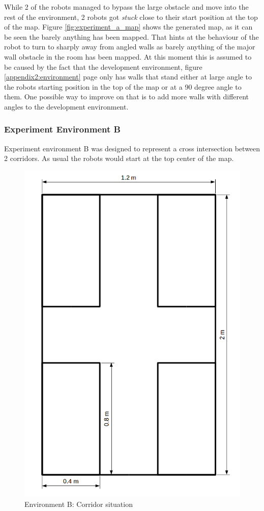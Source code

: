 While 2 of the robots managed to bypass the large obstacle and move into the rest of the environment, 2 robots got \textit{stuck} close to their start position at the top of the map. 
Figure \ref{fig:experiment_a_map} shows the generated map, as it can be seen the barely anything has been mapped. That hints at the behaviour of the robot to turn to sharply away from angled walls as barely anything of the major wall obstacle in the room has been mapped. 
At this moment this is assumed to be caused by the fact that the development environment, figure \ref{appendix2:environment} page \pageref{appendix2:environment} only has walls that stand either at large angle to the robots starting position in the top of the map or at a 90 degree angle to them.
One possible way to improve on that is to add more walls with different angles to the development environment. 

\subsubsection{Experiment Environment B}
Experiment environment B was designed to represent a cross intersection between 2 corridors. As usual the robots would start at the top center of the map. 

\begin{figure}[h]
\centering
\includegraphics[scale=0.4]{Chapter4/images/experiment_2.png}
\caption{Environment B: Corridor situation}
\label{fig:experiment_b}
\end{figure}


